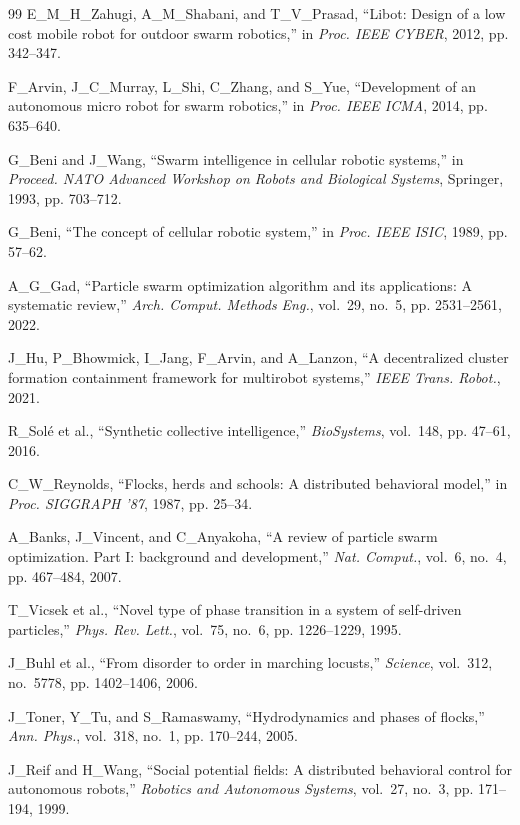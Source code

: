 \documentclass[letterpaper, 10pt, conference]{IEEEtran}
\begin{document}
\begin{thebibliography}{99}
E\_M\_H\_Zahugi, A\_M\_Shabani, and T\_V\_Prasad, ``Libot: Design of a low cost mobile robot for outdoor swarm robotics,'' in \emph{Proc. IEEE CYBER}, 2012, pp. 342--347.

F\_Arvin, J\_C\_Murray, L\_Shi, C\_Zhang, and S\_Yue, ``Development of an autonomous micro robot for swarm robotics,'' in \emph{Proc. IEEE ICMA}, 2014, pp. 635--640.

G\_Beni and J\_Wang, ``Swarm intelligence in cellular robotic systems,'' in \emph{Proceed. NATO Advanced Workshop on Robots and Biological Systems}, Springer, 1993, pp. 703--712.

G\_Beni, ``The concept of cellular robotic system,'' in \emph{Proc. IEEE ISIC}, 1989, pp. 57--62.

A\_G\_Gad, ``Particle swarm optimization algorithm and its applications: A systematic review,'' \emph{Arch. Comput. Methods Eng.}, vol.~29, no.~5, pp. 2531--2561, 2022.

J\_Hu, P\_Bhowmick, I\_Jang, F\_Arvin, and A\_Lanzon, ``A decentralized cluster formation containment framework for multirobot systems,'' \emph{IEEE Trans. Robot.}, 2021.

R\_Solé et al., ``Synthetic collective intelligence,'' \emph{BioSystems}, vol.~148, pp. 47--61, 2016.

C\_W\_Reynolds, ``Flocks, herds and schools: A distributed behavioral model,'' in \emph{Proc. SIGGRAPH '87}, 1987, pp. 25--34.

A\_Banks, J\_Vincent, and C\_Anyakoha, ``A review of particle swarm optimization. Part I: background and development,'' \emph{Nat. Comput.}, vol.~6, no.~4, pp. 467--484, 2007.

T\_Vicsek et al., ``Novel type of phase transition in a system of self-driven particles,'' \emph{Phys. Rev. Lett.}, vol.~75, no.~6, pp. 1226--1229, 1995.

J\_Buhl et al., ``From disorder to order in marching locusts,'' \emph{Science}, vol.~312, no.~5778, pp. 1402--1406, 2006.

J\_Toner, Y\_Tu, and S\_Ramaswamy, ``Hydrodynamics and phases of flocks,'' \emph{Ann. Phys.}, vol.~318, no.~1, pp. 170--244, 2005.

J\_Reif and H\_Wang, ``Social potential fields: A distributed behavioral control for autonomous robots,'' \emph{Robotics and Autonomous Systems}, vol.~27, no.~3, pp. 171--194, 1999.


\end{thebibliography}
\end{document}
